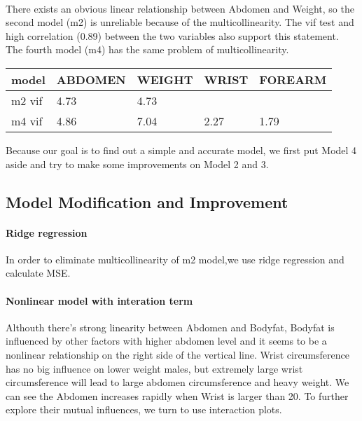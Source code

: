 \documentclass[11pt]{article}
\begin{document}
    \begin{center}
    \end{center}
    { \hspace*{\fill} \\}
    
    There exists an obvious linear relationship between Abdomen and Weight,
so the second model (m2) is unreliable because of the multicollinearity.
The vif test and high correlation (0.89) between the two variables also
support this statement. The fourth model (m4) has the same problem of
multicollinearity.

    \begin{longtable}[]{@{}lllll@{}}
\toprule
model & ABDOMEN & WEIGHT & WRIST & FOREARM\tabularnewline
\midrule
\endhead
m2 vif & 4.73 & 4.73 & &\tabularnewline
m4 vif & 4.86 & 7.04 & 2.27 & 1.79\tabularnewline
\bottomrule
\end{longtable}

    Because our goal is to find out a simple and accurate model, we first
put Model 4 aside and try to make some improvements on Model 2 and 3.

    \subsection{Model Modification and
Improvement}\label{model-modification-and-improvement}

    \paragraph{Ridge regression}\label{ridge-regression}

In order to eliminate multicollinearity of m2 model,we use ridge
regression and calculate MSE.

    \paragraph{Nonlinear model with interation
term}\label{nonlinear-model-with-interation-term}

    Althouth there's strong linearity between Abdomen and Bodyfat, Bodyfat
is influenced by other factors with higher abdomen level and it seems to
be a nonlinear relationship on the right side of the vertical line.
Wrist circumsference has no big influence on lower weight males, but
extremely large wrist circumsference will lead to large abdomen
circumsference and heavy weight. We can see the Abdomen increases
rapidly when Wrist is larger than 20. To further explore their mutual
influences, we turn to use interaction plots.
\end{document}
